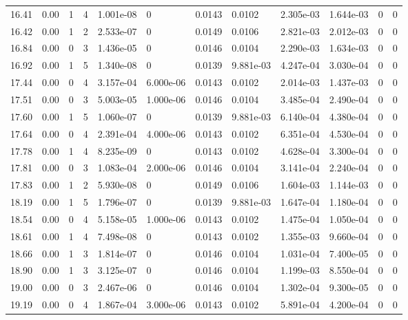 \documentclass[preview]{standalone}
\begin{document}
{{{{\begin{tabular}{L{1.2cm}C{1.2cm} C{0.3cm}C{0.5cm} C{1.4cm}C{1.4cm} C{1.4cm}C{1.4cm} C{1.6cm}C{1.6cm} C{1.6cm}C{1.6cm}}
  16.41  &  0.00  & 1     &  4 &  1.001e-08  & 0  &  0.0143&   0.0102& 2.305e-03 & 1.644e-03   &  0 & 0  \\ 
  16.42  &  0.00  & 1     &  2 &  2.533e-07  & 0  &  0.0149&   0.0106& 2.821e-03 & 2.012e-03   &  0 & 0  \\ 
  16.84  &  0.00  & 0     &  3 &  1.436e-05  & 0  &  0.0146&   0.0104& 2.290e-03 & 1.634e-03   &  0 & 0  \\ 
  16.92  &  0.00  & 1     &  5 &  1.340e-08  & 0  &  0.0139&   9.881e-03& 4.247e-04 & 3.030e-04   &  0 & 0  \\ 
  17.44  &  0.00  & 0     &  4 &  3.157e-04  & 6.000e-06  &  0.0143&   0.0102& 2.014e-03 & 1.437e-03   &  0 & 0  \\ 
  17.51  &  0.00  & 0     &  3 &  5.003e-05  & 1.000e-06  &  0.0146&   0.0104& 3.485e-04 & 2.490e-04   &  0 & 0  \\ 
  17.60  &  0.00  & 1     &  5 &  1.060e-07  & 0  &  0.0139&   9.881e-03& 6.140e-04 & 4.380e-04   &  0 & 0  \\ 
  17.64  &  0.00  & 0     &  4 &  2.391e-04  & 4.000e-06  &  0.0143&   0.0102& 6.351e-04 & 4.530e-04   &  0 & 0  \\ 
  17.78  &  0.00  & 1     &  4 &  8.235e-09  & 0  &  0.0143&   0.0102& 4.628e-04 & 3.300e-04   &  0 & 0  \\ 
  17.81  &  0.00  & 0     &  3 &  1.083e-04  & 2.000e-06  &  0.0146&   0.0104& 3.141e-04 & 2.240e-04   &  0 & 0  \\ 
  17.83  &  0.00  & 1     &  2 &  5.930e-08  & 0  &  0.0149&   0.0106& 1.604e-03 & 1.144e-03   &  0 & 0  \\ 
  18.19  &  0.00  & 1     &  5 &  1.796e-07  & 0  &  0.0139&   9.881e-03& 1.647e-04 & 1.180e-04   &  0 & 0  \\ 
  18.54  &  0.00  & 0     &  4 &  5.158e-05  & 1.000e-06  &  0.0143&   0.0102& 1.475e-04 & 1.050e-04   &  0 & 0  \\ 
  18.61  &  0.00  & 1     &  4 &  7.498e-08  & 0  &  0.0143&   0.0102& 1.355e-03 & 9.660e-04   &  0 & 0  \\ 
  18.66  &  0.00  & 1     &  3 &  1.814e-07  & 0  &  0.0146&   0.0104& 1.031e-04 & 7.400e-05   &  0 & 0  \\ 
  18.90  &  0.00  & 1     &  3 &  3.125e-07  & 0  &  0.0146&   0.0104& 1.199e-03 & 8.550e-04   &  0 & 0  \\ 
  19.00  &  0.00  & 0     &  3 &  2.467e-06  & 0  &  0.0146&   0.0104& 1.302e-04 & 9.300e-05   &  0 & 0  \\ 
  19.19  &  0.00  & 0     &  4 &  1.867e-04  & 3.000e-06  &  0.0143&   0.0102& 5.891e-04 & 4.200e-04   &  0 & 0  \\ 

\end{tabular}}}}}
\end{document}
